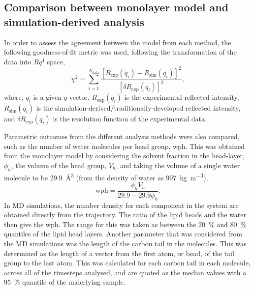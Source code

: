 \subsection{Comparison between monolayer model and simulation-derived analysis}
In order to assess the agreement between the model from each method, the following goodness-of-fit metric was used, following the transformation of the data into $Rq^4$ space,
%
\begin{equation}
\chi^2 = \sum_{i=1}^{N_{\text{data}}}{\frac{[R_{\text{exp}}(q_i) - R_{\text{sim}}(q_i)]^2}{[\delta R_{\text{exp}}(q_i)]^2}},
\end{equation}
%
where, $q_i$ is a given $q$-vector, $R_{\text{exp}}(q_i)$ is the experimental reflected intensity, $R_{\text{sim}}(q_i)$ is the simulation-derived/traditionally-developed reflected intensity, and $\delta R_{\text{exp}}(q_i)$ is the resolution function of the experimental data.

Parametric outcomes from the different analysis methods were also compared, such as the number of water molecules per head group, wph.
This was obtained from the monolayer model by considering the solvent fraction in the head-layer, $\phi_h$, the volume of the head group, $V_h$, and taking the volume of a single water molecule to be \SI{29.9}{\angstrom\cubed} (from the density of water as \SI{997}{\kg\per\meter\cubed}),
%
\begin{equation}
\text{wph}=\frac{\phi_h V_h}{29.9 - 29.9\phi_h}.
\label{equ:wph}
\end{equation}
%
In MD simulations, the number density for each component in the system are obtained directly from the trajectory.
The ratio of the lipid heads and the water then give the wph.
The range for this was taken as between the \SI{20}{\percent} and \SI{80}{\percent} quantiles of the lipid head layers.
Another parameter that was considered from the MD simulations was the length of the carbon tail in the molecules.
This was determined as the length of a vector from the first atom, or bead, of the tail group to the last atom.
This was calculated for each carbon tail in each molecule, across all of the timesteps analysed, and are quoted as the median values with a \SI{95}{\percent} quantile of the underlying sample. 
